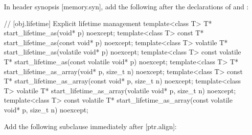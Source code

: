 In header  synopsis [memory.syn], add the following after the declarations of  and :


\begin{addedblock}
\begin{codeblock}
// [obj.lifetime] Explicit lifetime management
template<class T>
  T* start_lifetime_as(void* p) noexcept;
template<class T>
  const T* start_lifetime_as(const void* p) noexcept;
template<class T>
  volatile T* start_lifetime_as(volatile void* p) noexcept;
template<class T>
  const volatile T* start_lifetime_as(const volatile void* p) noexcept;
template<class T>
  T* start_lifetime_as_array(void* p, size_t n) noexcept;
template<class T>
  const T* start_lifetime_as_array(const void* p, size_t n) noexcept;
template<class T>
  volatile T* start_lifetime_as_array(volatile void* p, size_t n) noexcept;
template<class T>
  const volatile T* start_lifetime_as_array(const volatile void* p, size_t n) noexcept;
\end{codeblock}
\end{addedblock}

Add the following subclause immediately after [ptr.align]:


